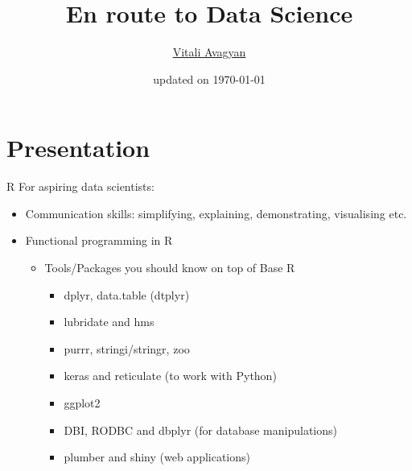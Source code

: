 \documentclass[compress,brown]{beamer}
\title{En route to Data Science}
\author{\href{https://www.linkedin.com/in/vitali-avagyan-a1566234/}{Vitali Avagyan}}
\institute{Data Scientist \\TurinTech \\London, UK}
\date{updated on \today}
\begin{document}
	\frame{
		\titlepage 
	}

\section{Presentation}

\begin{frame}{R}
For aspiring data scientists:
\begin{itemize}
	\item Communication skills: simplifying, explaining, demonstrating, visualising etc.
	\item Functional programming in R
	\begin{itemize}
		\item Tools/Packages you should know on top of Base R
		\begin{itemize}
			\item dplyr, data.table (dtplyr)
			\item lubridate and hms
			\item purrr, stringi/stringr, zoo
			\item keras and reticulate (to work with Python)
			\item ggplot2
			\item DBI, RODBC and dbplyr (for database manipulations)
			\item plumber and shiny (web applications)
		\end{itemize}
	\end{itemize}
\end{itemize}
\end{frame}
\end{document}
